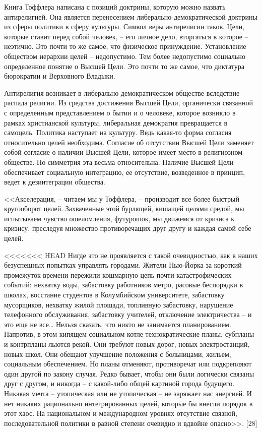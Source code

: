 \documentclass{book}
\begin{document}
{Книга Тоффлера написана с позиций доктрины, которую мож­но назвать антирелигией.  Она является перенесением либераль­но-демократической доктрины из сферы политики в сферу культуры. Символ веры антирелигии таков. Цели, которые ставит перед собой человек, -- его личное дело, вторгаться в которое -- неэтично. Это почти то же самое, что физическое принуждение. Установление обществом иерархии целей -- недопустимо. Тем более недопустимо социально определенное понятие о Высшей Цели. Это почти то же самое, что диктатура бюрократии и Вер­ховного Владыки.

Антирелигия возникает в либерально-демократическом об­ществе вследствие распада религии. Из средства достижения Высшей Цели, органически связанной с определенным пред­ставлением о бытии и о человеке, которое возникло в рамках христианской культуры, либеральная демократия превращает­ся в самоцель. Политика наступает на культуру. Ведь какая-то форма согласия относительно целей необходима. Согласие об отсутствии Высшей Цели заменяет собой согласие о наличии Высшей Цели, которое имеет место в религиозном обществе. Но симметрия эта весьма относительна. Наличие Высшей Цели обеспечивает социальную интеграцию, ее отсутствие, возведен­ное в принцип, ведет к дезинтеграции общества.

<<Акселерация, -- читаем мы у Тоффлера, -- производит все более быстрый кругооборот целей. Захваченные этой бурлящей, кишащей целями средой, мы испытываем чувство ошеломле­ния, футурошок, мы движемся от кризиса к кризису, пресле­дуя множество противоречащих друг другу и каждая самой себе целей.

<<<<<<< HEAD
Нигде это не проявляется с такой очевидностью, как в наших безуспешных попытках управлять городами. Жители Нью‑Йорка за короткий промежуток времени пережили кошмарную цепь почти катастрофических событий: нехватку воды, забастовку работников метро, расовые беспорядки в школах, восстание студентов в Колумбийском университете, забастовку мусорщиков, нехватку жилой площади, топливную забастовку, нарушение телефонного обслуживания, забастовку учителей, отключение электричества -- и это еще не все\ldots
Нельзя сказать, что никто не занимается планированием. Напротив, в этом кипящем социальном котле технократические планы, субпланы и контрпланы льются рекой. Они требуют новых дорог, новых электростанций, новых школ. Они обещают улучшение положения с больницами, жильем, социальным обеспечением. Но планы отменяют, противоречат или подкрепляют один другой по закону случая. Редко бывает, чтобы они были логически связаны друг с другом, и никогда -- с какой‑либо общей картиной города будущего. Никакая мечта -- утопиче­ская или не утопическая -- не заряжает нас энергией. И нет ника­ких рационально интегрированных целей, которые бы внесли порядок в этот хаос. На национальном и международном уров­нях отсутствие связной, последовательной политики в равной степени очевидно и вдвойне опасно>>. [28] 

}
\end{document}
